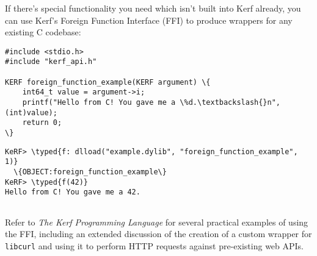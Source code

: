 \documentclass{article}
\newcommand{\typed}[1]{\textcolor{TealBlue}{#1}}
\begin{document}
\pagebreak
If there's special functionality you need which isn't built into Kerf already, you can use Kerf's Foreign Function Interface (FFI) to produce wrappers for any existing C codebase:

\begin{Verbatim}
#include <stdio.h>
#include "kerf_api.h"

KERF foreign_function_example(KERF argument) \{
	int64_t value = argument->i;
	printf("Hello from C! You gave me a \%d.\textbackslash{}n", (int)value);
	return 0;
\}
\end{Verbatim}
\begin{Verbatim}
KeRF> \typed{f: dlload("example.dylib", "foreign_function_example", 1)}
  \{OBJECT:foreign_function_example\}
KeRF> \typed{f(42)}
Hello from C! You gave me a 42.
  
\end{Verbatim}

Refer to \emph{The Kerf Programming Language} for several practical examples of using the FFI, including an extended discussion of the creation of a custom wrapper for \texttt{libcurl} and using it to perform HTTP requests against pre-existing web APIs.
\end{document}
